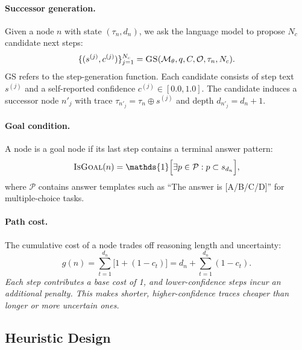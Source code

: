 \documentclass[11pt]{article}
\begin{document}
\paragraph{Successor generation.}
Given a node $n$ with state $(\tau_n, d_n)$, we ask the language model to propose $N_c$ candidate next steps:
\begin{equation}
\{(s^{(j)}, c^{(j)})\}_{j=1}^{N_c} = \textsc{GS}(\mathcal{M}_\theta, q, C, \mathcal{O}, \tau_n, N_c).
\label{eq:successor}
\end{equation}
\textsc{GS} refers to the step-generation function. Each candidate consists of step text $s^{(j)}$ and a self-reported confidence $c^{(j)} \in [0.0,1.0]$. The candidate induces a successor node $n'_j$ with trace $\tau_{n'_j} = \tau_n \oplus s^{(j)}$ and depth $d_{n'_j} = d_n + 1$.

\paragraph{Goal condition.}
A node is a goal node if its last step contains a terminal answer pattern:
\begin{equation}
\textsc{IsGoal}(n) = \mathds{1}\Big[\exists p \in \mathcal{P}: p \subset s_{d_n}\Big],
\label{eq:isgoal}
\end{equation}
where $\mathcal{P}$ contains answer templates such as ``The answer is [A/B/C/D]'' for multiple-choice tasks.

\paragraph{Path cost.}
The cumulative cost of a node trades off reasoning length and uncertainty:
\begin{equation}
g(n) = \sum_{t=1}^{d_n} \big[1 + (1-c_t)\big]
    = d_n + \sum_{t=1}^{d_n}(1-c_t).
\label{eq:gcost}
\end{equation}
\textit{Each step contributes a base cost of 1, and lower-confidence steps incur an additional penalty. This makes shorter, higher-confidence traces cheaper than longer or more uncertain ones.}

\subsection{Heuristic Design}
\label{sec:heuristic}
\end{document}
